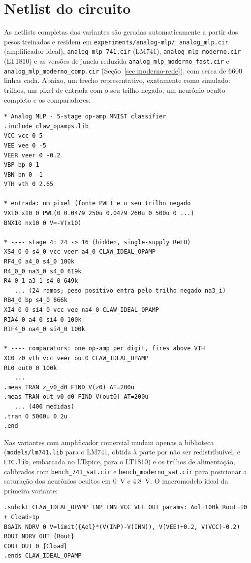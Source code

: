 \appendix

\section{Netlist do circuito}
\label{ap:netlist}

As netlists completas das variantes são geradas automaticamente a
partir dos pesos treinados e residem em
\texttt{experiments/analog-mlp/}: \texttt{analog\_mlp.cir}
(amplificador ideal), \texttt{analog\_mlp\_741.cir} (LM741),
\texttt{analog\_mlp\_moderno.cir} (LT1810) e as versões de janela
reduzida \texttt{analog\_mlp\_moderno\_fast.cir} e
\texttt{analog\_mlp\_moderno\_comp.cir}
(Seção~\ref{sec:moderno-rede}), com cerca de 6600 linhas cada.
Abaixo, um trecho representativo,
exatamente como simulado: trilhos, um pixel de entrada com o seu
trilho negado, um neurônio oculto completo e os comparadores.

{\small
\begin{verbatim}
* Analog MLP - 5-stage op-amp MNIST classifier
.include claw_opamps.lib
VCC vcc 0 5
VEE vee 0 -5
VEER veer 0 -0.2
VBP bp 0 1
VBN bn 0 -1
VTH vth 0 2.65

* entrada: um pixel (fonte PWL) e o seu trilho negado
VX10 x10 0 PWL(0 0.0479 250u 0.0479 260u 0 500u 0 ...)
BNX10 nx10 0 V=-V(x10)

* ---- stage 4: 24 -> 16 (hidden, single-supply ReLU)
XS4_0 0 s4_0 vcc veer a4_0 CLAW_IDEAL_OPAMP
RF4_0 a4_0 s4_0 100k
R4_0_0 na3_0 s4_0 619k
R4_0_1 a3_1 s4_0 649k
   ... (24 ramos; peso positivo entra pelo trilho negado na3_i)
RB4_0 bp s4_0 866k
XI4_0 0 si4_0 vcc vee na4_0 CLAW_IDEAL_OPAMP
RIA4_0 a4_0 si4_0 100k
RIF4_0 na4_0 si4_0 100k

* ---- comparators: one op-amp per digit, fires above VTH
XC0 z0 vth vcc veer out0 CLAW_IDEAL_OPAMP
RL0 out0 0 100k
   ...
.meas TRAN z_v0_d0 FIND V(z0) AT=200u
.meas TRAN out_v0_d0 FIND V(out0) AT=200u
   ... (400 medidas)
.tran 0 5000u 0 2u
.end
\end{verbatim}
}

Nas variantes com amplificador comercial mudam apenas a biblioteca
(\texttt{models/lm741.lib} para o LM741, obtida à parte por não ser
redistribuível, e \texttt{LTC.lib}, embarcada no LTspice, para o
LT1810) e os trilhos de alimentação, calibrados com
\texttt{bench\_741\_sat.cir} e \texttt{bench\_moderno\_sat.cir} para
posicionar a saturação dos neurônios ocultos em \SI{0}{\volt} e
\SI{4,8}{\volt}. O macromodelo ideal da primeira variante:

{\small
\begin{verbatim}
.subckt CLAW_IDEAL_OPAMP INP INN VCC VEE OUT params: Aol=100k Rout=10
+ Cload=1p
BGAIN NDRV 0 V=limit({Aol}*(V(INP)-V(INN)), V(VEE)+0.2, V(VCC)-0.2)
ROUT NDRV OUT {Rout}
COUT OUT 0 {Cload}
.ends CLAW_IDEAL_OPAMP
\end{verbatim}
}

